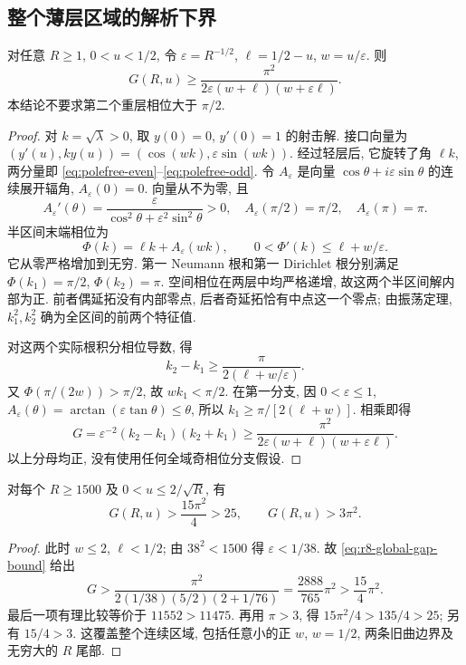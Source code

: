 \subsection{整个薄层区域的解析下界}\label{sec:sliver}
\begin{lemma}[连续相位速度给出的谱隙下界]\label{lem:r8-phase-speed}
对任意 $R\ge1$, $0<u<1/2$, 令 $\varepsilon=R^{-1/2}$,
$\ell=1/2-u$, $w=u/\varepsilon$. 则
\begin{equation}
 G(R,u)\ge\frac{\pi^2}{2\varepsilon(w+\ell)(w+\varepsilon\ell)}.
 \label{eq:r8-global-gap-bound}
\end{equation}
本结论不要求第二个重层相位大于 $\pi/2$.
\end{lemma}
\begin{proof}
对 $k=\sqrt\lambda>0$, 取 $y(0)=0$, $y'(0)=1$ 的射击解.
接口向量为 $(y'(u),ky(u))=(\cos(wk),\varepsilon\sin(wk))$.
经过轻层后, 它旋转了角 $\ell k$, 两分量即 \eqref{eq:polefree-even}--\eqref{eq:polefree-odd}.
令 $A_\varepsilon$ 是向量 $\cos\theta+i\varepsilon\sin\theta$ 的连续展开辐角,
$A_\varepsilon(0)=0$. 向量从不为零, 且
\[
 A_\varepsilon'(\theta)=\frac{\varepsilon}{\cos^2\theta+\varepsilon^2\sin^2\theta}>0,
 \quad A_\varepsilon(\pi/2)=\pi/2,\quad A_\varepsilon(\pi)=\pi.
\]
半区间末端相位为
\[
 \Phi(k)=\ell k+A_\varepsilon(wk),\qquad
 0<\Phi'(k)\le\ell+w/\varepsilon.
\]
它从零严格增加到无穷. 第一 Neumann 根和第一 Dirichlet 根分别满足
$\Phi(k_1)=\pi/2$, $\Phi(k_2)=\pi$.
空间相位在两层中均严格递增, 故这两个半区间解内部为正.
前者偶延拓没有内部零点, 后者奇延拓恰有中点这一个零点;
由振荡定理, $k_1^2,k_2^2$ 确为全区间的前两个特征值.

对这两个实际根积分相位导数, 得
\[
 k_2-k_1\ge\frac{\pi}{2(\ell+w/\varepsilon)}.
\]
又 $\Phi(\pi/(2w))>\pi/2$, 故 $wk_1<\pi/2$.
在第一分支, 因 $0<\varepsilon\le1$,
$A_\varepsilon(\theta)=\arctan(\varepsilon\tan\theta)\le\theta$,
所以 $k_1\ge\pi/[2(\ell+w)]$.
相乘即得
\[
 G=\varepsilon^{-2}(k_2-k_1)(k_2+k_1)
 \ge\frac{\pi^2}{2\varepsilon(w+\ell)(w+\varepsilon\ell)}.
\]
以上分母均正, 没有使用任何全域奇相位分支假设.
\end{proof}

\begin{lemma}\label{lem:sliver}
对每个 $R\ge1500$ 及 $0<u\le2/\sqrt R$, 有
\begin{equation}
 G(R,u)>\frac{15\pi^2}{4}>25,\qquad G(R,u)>3\pi^2.
 \label{eq:r8-sliver-margin}
\end{equation}
\end{lemma}
\begin{proof}
此时 $w\le2$, $\ell<1/2$; 由 $38^2<1500$ 得 $\varepsilon<1/38$.
故 \eqref{eq:r8-global-gap-bound} 给出
\[
 G>\frac{\pi^2}{2(1/38)(5/2)(2+1/76)}
 =\frac{2888}{765}\pi^2>\frac{15}{4}\pi^2.
\]
最后一项有理比较等价于 $11552>11475$.
再用 $\pi>3$, 得 $15\pi^2/4>135/4>25$; 另有 $15/4>3$.
这覆盖整个连续区域, 包括任意小的正 $w$, $w=1/2$, 两条旧曲边界及无穷大的 $R$ 尾部.
\end{proof}

